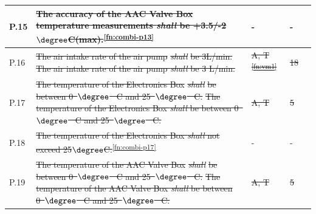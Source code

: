 \documentclass[a4paper,12pt,twoside, final]{article}
\providecommand{\DIFaddtex}[1]{{\protect\color{blue}\uwave{#1}}} %
\providecommand{\DIFdeltex}[1]{{\protect\color{red}\sout{#1}}}                      %
\providecommand{\DIFaddbegin}{} %
\providecommand{\DIFaddend}{} %
\providecommand{\DIFdelbegin}{} %
\providecommand{\DIFdelend}{} %
\providecommand{\DIFadd}[1]{\texorpdfstring{\DIFaddtex{#1}}{#1}} %
\providecommand{\DIFdel}[1]{\texorpdfstring{\DIFdeltex{#1}}{}} %
\newcommand{\DIFscaledelfig}{0.5}
\newlength{\DIFdelgraphicswidth} %
\newlength{\DIFdelgraphicsheight} %
\newcommand{\DIFaddincludegraphics}[2][]{{\color{blue}\fbox{\DIFOincludegraphics[#1]{#2}}}} %
\newcommand{\DIFdelincludegraphics}[2][]{%
\sbox{\DIFdelgraphicsbox}{\DIFOincludegraphics[#1]{#2}}%
\settoboxwidth{\DIFdelgraphicswidth}{\DIFdelgraphicsbox} %
\settoboxtotalheight{\DIFdelgraphicsheight}{\DIFdelgraphicsbox} %
\scalebox{\DIFscaledelfig}{%
\parbox[b]{\DIFdelgraphicswidth}{\usebox{\DIFdelgraphicsbox}\\[-\baselineskip] \rule{\DIFdelgraphicswidth}{0em}}\llap{\resizebox{\DIFdelgraphicswidth}{\DIFdelgraphicsheight}{%
\setlength{\unitlength}{\DIFdelgraphicswidth}%
\begin{picture}(1,1)%
\thicklines\linethickness{2pt} %
{\color[rgb]{1,0,0}\put(0,0){\framebox(1,1){}}}%
{\color[rgb]{1,0,0}\put(0,0){\line( 1,1){1}}}%
{\color[rgb]{1,0,0}\put(0,1){\line(1,-1){1}}}%
\end{picture}%
}\hspace*{3pt}}} %
} %
\DeclareRobustCommand{\DIFaddbegin}{\DIFOaddbegin \let\includegraphics\DIFaddincludegraphics} %
\DeclareRobustCommand{\DIFaddend}{\DIFOaddend \let\includegraphics\DIFOincludegraphics} %
\DeclareRobustCommand{\DIFdelbegin}{\DIFOdelbegin \let\includegraphics\DIFdelincludegraphics} %
\DeclareRobustCommand{\DIFdelend}{\DIFOaddend \let\includegraphics\DIFOincludegraphics} %
\begin{document}
\begin{longtable}[]{|m{}| m{} |m{} |m{}|m{}|}
P.15 & \st{The accuracy of the AAC Valve Box temperature measurements \textit{shall} be +3.5/-2$\degree$C(max).}\textsuperscript{\ref{fn:combi-p13}}   & - &- & \DIFaddbegin \DIFadd{- }\DIFaddend \\ \hline
P.16 & \DIFdelbegin \DIFdel{The air intake rate of the air pump }\textit{\DIFdel{shall}} %
\DIFdel{be 3L/min.                                                                                                                       }\DIFdelend \DIFaddbegin \st{The air intake rate of the air pump \textit{shall} be 3 L/min.} \DIFadd{\textsuperscript{\ref{designRequirement}}   }\DIFaddend & \DIFdelbegin \DIFdel{A, T \textsuperscript{\ref{fn:vm1}}       }\DIFdelend \DIFaddbegin \DIFadd{- }\DIFaddend &\DIFdelbegin \DIFdel{18            }\DIFdelend \DIFaddbegin \DIFadd{- }\DIFaddend & \DIFaddbegin \DIFadd{- }\DIFaddend \\ \hline
P.17 & \DIFdelbegin \DIFdel{The temperature of the Electronics Box }\textit{\DIFdel{shall}} %
\DIFdel{be between 0\mbox{%
$\degree$
}%
C and 25\mbox{%
$\degree$
}%
C.                                                                                                   }\DIFdelend \DIFaddbegin \st{The temperature of the Electronics Box \textit{shall} be between 0\mbox{%
$\degree$
}%
C and 25\mbox{%
$\degree$
}%
C.} \DIFadd{\textsuperscript{\ref{designRequirement}}   }\DIFaddend & \DIFdelbegin \DIFdel{A, T       }\DIFdelend \DIFaddbegin \DIFadd{- }\DIFaddend &\DIFdelbegin \DIFdel{5           }\DIFdelend \DIFaddbegin \DIFadd{- }\DIFaddend & \DIFaddbegin \DIFadd{- }\DIFaddend \\ \hline
P.18 & \st{The temperature of the Electronics Box \textit{shall} not exceed 25$\degree$C.}\textsuperscript{\ref{fn:combi-p17}}   & - &- & \DIFaddbegin \DIFadd{- }\DIFaddend \\ \hline
P.19 & \DIFdelbegin \DIFdel{The temperature of the AAC Valve Box }\textit{\DIFdel{shall}} %
\DIFdel{be between 0\mbox{%
$\degree$
}%
C and 25\mbox{%
$\degree$
}%
C.                                                                                                    }\DIFdelend \DIFaddbegin \st{The temperature of the AAC Valve Box \textit{shall} be between 0\mbox{%
$\degree$
}%
C and 25\mbox{%
$\degree$
}%
C.}\DIFadd{\textsuperscript{\ref{designRequirement}}   }\DIFaddend & \DIFdelbegin \DIFdel{A, T       }\DIFdelend \DIFaddbegin \DIFadd{- }\DIFaddend &\DIFdelbegin \DIFdel{5            }\DIFdelend \DIFaddbegin \DIFadd{- }\DIFaddend & \DIFaddbegin \DIFadd{- }\DIFaddend \\ \hline

\end{longtable}
\end{document}
